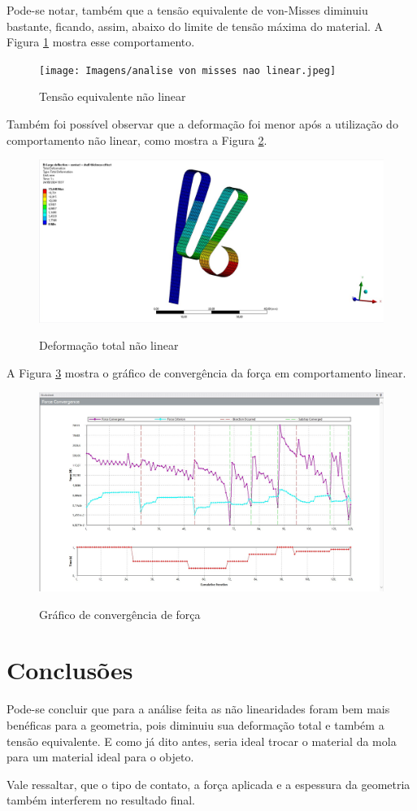 \documentclass[acronym,symbols]{fei}
\begin{document}
Pode-se notar, também que a tensão equivalente de von-Misses diminuiu bastante, ficando, assim, abaixo do limite de tensão máxima do material. A Figura \ref{fig: vonmissesnl} mostra esse comportamento.

\begin{figure}[!htb]
    \centering
    \caption{Tensão equivalente não linear}
    \texttt{[image: Imagens/analise von misses nao linear.jpeg]}
    \label{fig: vonmissesnl}
\end{figure}

Também foi possível observar que a deformação foi menor após a utilização do comportamento não linear, como mostra a Figura \ref{fig: defnl}.

\begin{figure}[!htb]
    \centering
    \caption{Deformação total não linear}
    \includegraphics[width=0.7\linewidth]{Imagens/deformação total nao linear.jpeg}
    \label{fig: defnl}
\end{figure}

A Figura \ref{fig: convergencia} mostra o gráfico de convergência da força em comportamento linear.


\begin{figure}[!htb]
    \centering
    \caption{Gráfico de convergência de força}
    \includegraphics[width=0.7\linewidth]{Imagens/convergencia da força nao linear.jpeg}
    \label{fig: convergencia}
\end{figure}

\chapter{Conclusões}

Pode-se concluir que para a análise feita as não linearidades foram bem mais benéficas para a geometria, pois diminuiu sua deformação total e também a tensão equivalente. E como já dito antes, seria ideal trocar o material da mola para um material ideal para o objeto. 

Vale ressaltar, que o tipo de contato, a força aplicada e a espessura da geometria também interferem no resultado final.



\printbibliography
\end{document}
